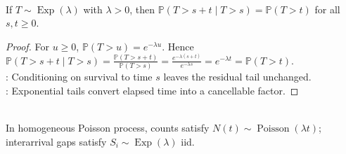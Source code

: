 \begin{proposition} \label{prop:exponential-memoryless-property} \\
If $T\sim\operatorname{Exp}(\lambda)$ with $\lambda>0$, then $\mathbb{P}(T>s+t\mid T>s)=\mathbb{P}(T>t)$ for all $s,t\geq0$.
\begin{proof}
For $u\geq0$, $\mathbb{P}(T>u)=e^{-\lambda u}$. Hence $\mathbb{P}(T>s+t\mid T>s)=\frac{\mathbb{P}(T>s+t)}{\mathbb{P}(T>s)}=\frac{e^{-\lambda(s+t)}}{e^{-\lambda s}}=e^{-\lambda t}=\mathbb{P}(T>t)$.\\
: Conditioning on survival to time $s$ leaves the residual tail unchanged.\\
: Exponential tails convert elapsed time into a cancellable factor.
\end{proof}
\end{proposition}

\begin{remark} \label{rem:poisson-process-distribution-link} \\
In homogeneous Poisson process, counts satisfy $N(t)\sim\operatorname{Poisson}(\lambda t)$; interarrival gaps satisfy $S_i\sim\operatorname{Exp}(\lambda)$ iid.
\end{remark}

